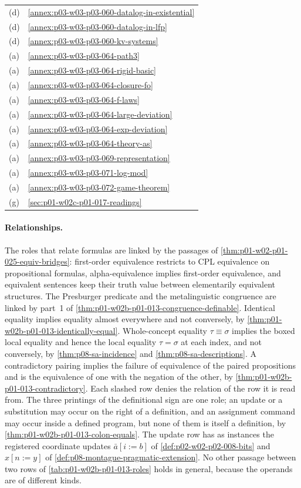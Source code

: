 \begin{longtable}{@{}p{}p{}@{}}
(d) & \cref{annex:p03-w03-p03-060-datalog-in-existential} \\
(d) & \cref{annex:p03-w03-p03-060-datalog-in-lfp} \\
(d) & \cref{annex:p03-w03-p03-060-kv-systems} \\
(a) & \cref{annex:p03-w03-p03-064-path3} \\
(a) & \cref{annex:p03-w03-p03-064-rigid-basic} \\
(a) & \cref{annex:p03-w03-p03-064-closure-fo} \\
(a) & \cref{annex:p03-w03-p03-064-f-laws} \\
(a) & \cref{annex:p03-w03-p03-064-large-deviation} \\
(a) & \cref{annex:p03-w03-p03-064-exp-deviation} \\
(a) & \cref{annex:p03-w03-p03-064-theory-as} \\
(a) & \cref{annex:p03-w03-p03-069-representation} \\
(a) & \cref{annex:p03-w03-p03-071-log-mod} \\
(a) & \cref{annex:p03-w03-p03-072-game-theorem} \\
(g) & \cref{sec:p01-w02c-p01-017-readings} \\
\end{longtable}
\endgroup


\paragraph{Relationships.}  The roles that relate formulas are linked by the
passages of \cref{thm:p01-w02-p01-025-equiv-bridges}: first-order equivalence
restricts to CPL equivalence on propositional formulas, alpha-equivalence
implies first-order equivalence, and equivalent sentences keep their truth
value between elementarily equivalent structures.  The Presburger predicate
and the metalinguistic congruence are linked by part~1 of
\cref{thm:p01-w02b-p01-013-congruence-definable}.  Identical equality implies
equality almost everywhere and not conversely, by
\cref{thm:p01-w02b-p01-013-identically-equal}.  Whole-concept equality
\(\tau\equiv\sigma\) implies the boxed local equality and hence the local
equality \(\tau=\sigma\) at each index, and not conversely, by
\cref{thm:p08-sa-incidence} and \cref{thm:p08-sa-descriptions}.  A
contradictory pairing implies the failure of equivalence of the paired
propositions and is the equivalence of one with the negation of the other,
by \cref{thm:p01-w02b-p01-013-contradictory}.  Each slashed row denies the
relation of the row it is read from.  The three printings of the
definitional sign are one role; an update or a substitution may occur on
the right of a definition, and an assignment command may occur inside a
defined program, but none of them is itself a definition, by
\cref{thm:p01-w02b-p01-013-colon-equals}.  The update row has as instances the
registered coordinate updates \(\bar a[i{:=}b]\) of
\cref{def:p02-w02-p02-008-bits} and \(x[n:=y]\) of
\cref{def:p08-montague-pragmatic-extension}.  No other passage between two rows of
\cref{tab:p01-w02b-p01-013-roles} holds in general, because the operands
are of different kinds.


